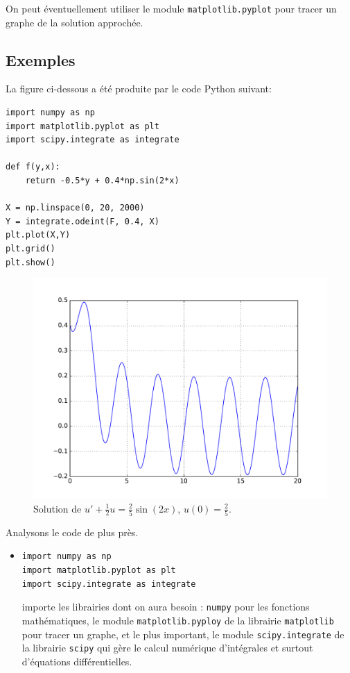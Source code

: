 \documentclass[../main.tex]{subfiles}
\begin{document}
On peut éventuellement utiliser le module \texttt{matplotlib.pyplot} pour tracer un graphe de la solution approchée.

\subsection{Exemples}

\begin{exe}
La figure ci-dessous a été produite par le code \textsf{Python} suivant:
\begin{verbatim}
import numpy as np
import matplotlib.pyplot as plt
import scipy.integrate as integrate

def f(y,x):
    return -0.5*y + 0.4*np.sin(2*x)

X = np.linspace(0, 20, 2000)
Y = integrate.odeint(F, 0.4, X)
plt.plot(X,Y)
plt.grid()
plt.show()
\end{verbatim}

\begin{figure}[H]
	\includegraphics[width=\textwidth]{figures/figure_1.pdf}
	\caption{Solution de $u'+\frac{1}{2}u = \frac{2}{5}\sin(2x)$, $u(0)=\frac{2}{5}$.}
	\label{numIntEx1}
\end{figure}

Analysons le code de plus près. \begin{itemize}
	\item \begin{verbatim}
import numpy as np
import matplotlib.pyplot as plt
import scipy.integrate as integrate
	\end{verbatim}
	importe les librairies dont on aura besoin : \texttt{numpy} pour les fonctions mathématiques, le module \texttt{matplotlib.pyploy} de la librairie \texttt{matplotlib} pour tracer un graphe, et le plus important, le module \texttt{scipy.integrate} de la librairie \texttt{scipy} qui gère le calcul numérique d'intégrales et surtout d'équations différentielles.
	

\end{itemize}
\end{exe}
\end{document}
